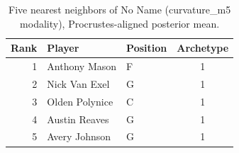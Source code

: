 \begin{table}[htbp]
  \centering\small
  \begin{tabular}{rllc}
    \toprule
    Rank & Player & Position & Archetype \\
    \midrule
    1 & Anthony Mason & F & 1 \\
    2 & Nick Van Exel & G & 1 \\
    3 & Olden Polynice & C & 1 \\
    4 & Austin Reaves & G & 1 \\
    5 & Avery Johnson & G & 1 \\
    \bottomrule
  \end{tabular}
  \caption{Five nearest neighbors of No Name (curvature_m5 modality), Procrustes-aligned posterior mean.}
  \label{tab:No_Name_neighbors_curvature_m5}
\end{table}


